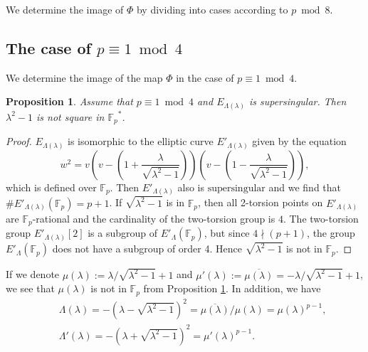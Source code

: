 \documentclass[a4paper, 11pt]{article}
\theoremstyle{plain}
\newtheorem{prop}[defn]{Proposition}
\newcommand{\?}{\textcolor{red}{??}}
\newcommand{\lm}{\lambda}
\newcommand{\Lm}{\Lambda}
\newcommand{\fp}{\mathbb{F}_p}
\newcommand{\fpp}{\mathbb{F}_{p^2}}
\newcommand{\super}{\text{supersingular}}
\begin{document}

    
We determine the image of $\Phi$ by dividing into cases according to $p \bmod 8$\textcolor{black}{.}

\subsection{The case of $p \equiv 1 \bmod 4$}
We determine the image of the map $\Phi$ in the case of $p \equiv 1 \bmod 4$. 
\begin{prop}
\label{propnotinfp}
    Assume that $p \equiv 1 \bmod 4$ and $E_{\Lm(\lm)}$ is supersingular. Then ${\lambda}^2-1$ is not square in ${\fp}^{*}$.
\end{prop}
\begin{proof}
    $E_{\Lm(\lm)}$ is isomorphic to the elliptic curve $E'_{\Lm(\lm)}$ given by the equation 
    \[
    w^2=v\left(v-\left(1+\frac{\lambda}{\sqrt{{\lambda}^2-1}}\right)\right) \left(v-\left(1-\frac{\lambda}{\sqrt{{\lambda}^2-1}}\right) \right),
    \] which is defined over $\fp$. Then $E'_{\Lm(\lm)}$ also is $\super$ and we find that $\# E'_{\Lm(\lm)}(\fp)=p+1$. If $\sqrt{{\lambda}^2-1}$ is in $\fp$, then all 2-torsion points on $E'_{\Lm(\lm)}$ are $\fp$-rational and the cardinality of the two-torsion group is $4$. The two-torsion group $E'_{\Lm(\lm)}[2]$ is a subgroup of $E'_{\Lm}(\fp)$, but since $4 \nmid (p+1)$, the group $E'_{\Lm}(\fp)$ does not have a subgroup of order 4. Hence $\sqrt{{\lambda}^2-1}$ is not in $\fp$.
\end{proof}


If we denote $\mu(\lm):={\lambda}/{\sqrt{{\lambda}^2-1}}+1$ and $ {\mu}'(\lm):=\overline{\mu(\lm)}={-\lambda}/{\sqrt{{\lambda}^2-1}}+1$, we see that $\mu(\lm)$ is not in $\fp$ from Proposition \ref{propnotinfp}. In addition, we have
\begin{eqnarray*}
  &&  \Lm(\lm)=-(\lambda-\sqrt{{\lambda}^2-1})^2=\overline{\mu(\lm)} / \mu(\lm)={\mu(\lm)}^{p-1},\\
  &&  {\Lm}'(\lm)=-(\lambda+\sqrt{{\lambda}^2-1})^2={{\mu}'(\lm)}^{p-1}.
\end{eqnarray*}
\end{document}
